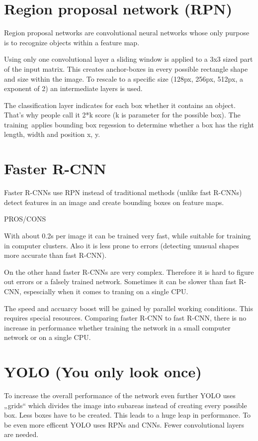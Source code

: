 \documentclass[a4paper,13pt,twoside]{book}
\begin{document}
\section{Region proposal network (RPN)}

Region proposal networks are convolutional neural networks whose only purpose is to recognize objects within a feature map.

Using only one convolutional layer a sliding window is applied to a 3x3 sized part of the input matrix. This creates anchor-boxes in every possible rectangle shape and size within the image. To rescale to a specific size (128px, 256px, 512px, a exponent of 2) an intermediate layers is used.

The classification layer indicates for each box whether it contains an object. That's why people call it 2*k score (k is parameter for the possible box). The training applies bounding box regession to determine whether a box has the right length, width and position x, y.

\section{Faster R-CNN}

Faster R-CNNs use RPN instead of traditional methods (unlike fast R-CNNs) detect features in an image and create bounding boxes on feature maps.

PROS/CONS

With about 0.2s per image it can be trained very fast, while suitable for training in computer clusters. Also it is less prone to errors (detecting unusual shapes more accurate than fast R-CNN).

On the other hand faster R-CNNs are very complex. Therefore it is hard to figure out  errors or a falsely trained network. Sometimes it can be slower than fast R-CNN, espescially when it comes to traning on a single CPU.

The speed and accuarcy boost will be gained by parallel working conditions. This requires special resources. Comparing faster R-CNN to fast R-CNN, there is no increase in performance whether training the network in a small computer network or on a single CPU.

\section{YOLO (You only look once)}

To increase the overall performance of the network even further YOLO uses „grids“ which divides the image into subareas instead of creating every possible box. Less boxes have to be created. This leads to a huge leap in performance. To be even more efficent YOLO uses RPNs and CNNs. Fewer convolutional layers are needed.
\end{document}
